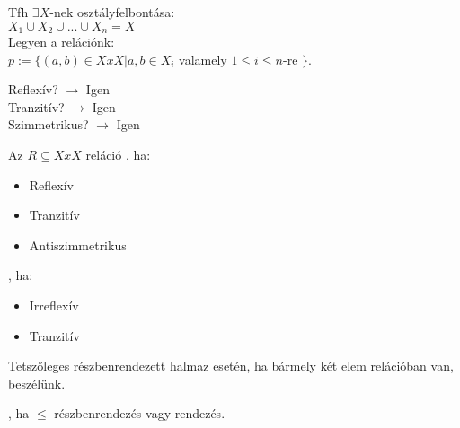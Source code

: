 \begin{frame}
\begin{tcolorbox}[title={Tétel: Ekvivalenciareláció és osztályfelbontás kapcsolata}]
Tfh ${\exists}X$-nek osztályfelbontása:\\

$X_1 \cup X_2 \cup ... \cup X_n = X$\\

Legyen a relációnk:\\

$p := \{(a,b) \in X x X | a, b \in X_i$ valamely $1 \leq i \leq n$-re $\}$.\\
\mmedskip

Reflexív? $\rightarrow$ Igen\\
Tranzitív? $\rightarrow$ Igen\\
Szimmetrikus? $\rightarrow$ Igen
\end{tcolorbox}
\end{frame}


\begin{frame}
\begin{tcolorbox}[title={Def.: Részbenrendezés, Szigorú részbenrendezés}]
Az $R \subseteq X x X$ reláció , ha:\\
\begin{itemize}
\item Reflexív
\item Tranzitív
\item Antiszimmetrikus
\end{itemize}
\mmedskip

, ha:\\
\begin{itemize}
\item Irreflexív
\item Tranzitív
\end{itemize}
\end{tcolorbox}

\begin{tcolorbox}[title={Def.: Teljes rendezés}]
Tetszőleges részbenrendezett halmaz esetén, ha bármely két elem relációban van,  beszélünk.
\end{tcolorbox}

\begin{tcolorbox}[title={Def.: Részbenrendezett, vagy rendezett struktúra}]
, ha ${\leq}$ részbenrendezés vagy rendezés.
\end{tcolorbox}

\begin{tcolorbox}[title={Def.: Diagonális reláció}]
\end{tcolorbox}


\end{frame}
